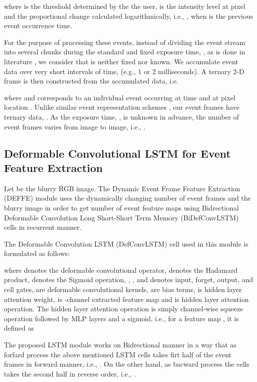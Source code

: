 \documentclass{article}
\begin{document}
where  is the threshold determined by the the user,  is the intensity level at pixel  and the proportional change calculated logarithmically, i.e.,  , when  is the previous event occurrence time.

For the purpose of processing these events, instead of dividing the event stream into several chunks during the standard and fixed exposure time, , as is done in literature \cite{MADANet, EFNet}, we consider that  is neither fixed nor known. We accumulate event data over very short intervals of time,  (e.g., 1 or 2 milliseconds). A ternary 2-D frame is then constructed from the accumulated data, i.e. 

where  and  corresponds to an individual event occurring at time  and at pixel location . Unlike similar event representation schemes \cite{depthevent, opticalflow, tracking}, our event frames have ternary data, . As the exposure time, , is unknown in advance, the number of event frames varies from image to image, i.e., .

\subsection{Deformable Convolutional LSTM for Event Feature Extraction}
Let  be the blurry RGB image. The Dynamic Event Frame Feature Extraction (DEFFE)
module uses the dynamically changing number of event frames and the blurry image in order to get  number of event feature maps using
Bidrectional Deformable Convolution Long Short-Short Term Memory (BiDefConvLSTM) cells in recurrent manner. 

The Deformable Convolution LSTM (DefConvLSTM) cell used in this module is formulated as follows: 

where  denotes the deformable convolutional operator,  denotes the
Hadamard product,  denotes the Sigmoid operation, , ,  and
 denotes input, forget, output, and cell gates,  are
deformable convolutional kernels,  are bias terms,  is hidden layer attention weight, 
 is -channel
extracted feature map and  is hidden layer attention operation. The hidden layer attention
operation is simply channel-wise squeeze operation followed by MLP layers and a sigmoid, i.e.,
for a feature map , it is defined as

The proposed LSTM module works on Bidrectional manner in a way that as forfard
process the above mentioned LSTM cells takes firt half of the event frames in 
forward manner, i.e., . On the other hand, as bacward process the 
cells takes the second half in reverse order, i.e., .
\end{document}
